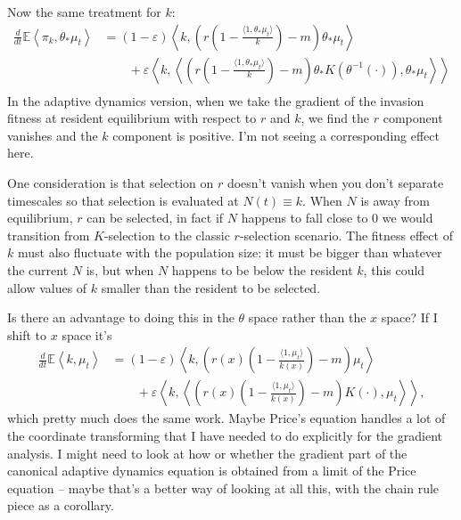 \documentclass[11pt]{amsart}
\theoremstyle{remark}
\theoremstyle{definition}
\begin{document}
Now the same treatment for $k$:
\begin{align*}
	\frac{d}{dt}\mathbb{E}\left\langle \pi_k, \theta_{*}\mu_t \right\rangle
	&= (1-\varepsilon) \left\langle k, \left( r \left( 1 - \frac{\langle 1, \theta_*{\mu_t}\rangle}{k} \right) - m \right ) \theta_*\mu_t \right\rangle \\
	& \qquad\mbox{} + \varepsilon \left\langle k, \left\langle \left( r \left( 1 - \frac{\langle 1, \theta_*{\mu_t}\rangle}{k} \right) - m \right) \theta_*K(\theta^{-1}(\cdot)), \theta_{*}\mu_t \right\rangle \right\rangle \\
\end{align*}
In the adaptive dynamics version, when we take the gradient
of the invasion fitness at resident equilibrium with respect to
$r$ and $k$, we find the $r$ component vanishes and the $k$
component is positive.
I'm not seeing a corresponding effect here.

One consideration is that selection on $r$ doesn't vanish
when you don't separate timescales so that selection is evaluated
at $N(t)\equiv k$.
When $N$ is away from equilibrium, $r$ can be selected,
in fact if $N$ happens to fall close to 0 we would transition
from $K$-selection to the classic $r$-selection scenario.
The fitness effect of $k$ must also fluctuate with the population size:
it must be bigger than whatever the current $N$ is, but
when $N$ happens to be below the resident $k$,
this could allow values of $k$ smaller than the resident to be selected.

Is there an advantage to doing this in the $\theta$ space
rather than the $x$ space?
If I shift to $x$ space it's
\begin{align*}
	\frac{d}{dt}\mathbb{E}\left\langle k, \mu_t \right\rangle
	&= (1-\varepsilon) \left\langle k, \left( r(x) \left( 1 - \frac{\langle 1,\mu_t\rangle}{k(x)} \right) - m \right) \mu_t \right\rangle \\
	& \qquad\mbox{} + \varepsilon \left\langle k, \left\langle \left( r(x) \left( 1 - \frac{\langle 1, \mu_t\rangle}{k(x)} \right) - m \right) K(\cdot), \mu_t \right\rangle \right\rangle,
\end{align*}
which pretty much does the same work. 
Maybe Price's equation handles a lot of
the coordinate transforming that I have needed to do explicitly for the
gradient analysis.
I might need to look at how or whether the gradient part of the
canonical adaptive dynamics equation is obtained from a
limit of the Price equation -- maybe that's a better way of
looking at all this, with the chain rule piece as a corollary.

%


\vfill
\end{document}
